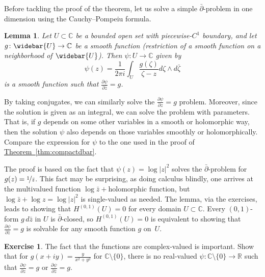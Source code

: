 \documentclass[12pt,openany]{book}
\newcommand{\sabs}[1]{\lvert {#1} \rvert}
\newcommand{\C}{{\mathbb{C}}}
\newcommand{\R}{{\mathbb{R}}}
\theoremstyle{plain}
\newtheorem{lemma}[thm]{Lemma}
\theoremstyle{remark}
\theoremstyle{definition}
\newenvironment{exbox}{%
    \def\FrameCommand{\vrule width 1pt \relax\hspace{10pt}}%
    \MakeFramed{\advance\hsize-\width\FrameRestore}%
}{%
    \endMakeFramed
}
\theoremstyle{exercise}
\newtheorem{exercise}{Exercise}[section]
\theoremstyle{example}
\newcommand{\thmref}[1]{\hyperref[#1]{Theorem~\ref*{#1}}}
\begin{document}
Before tackling the proof of the theorem, let us
solve a simple $\bar{\partial}$-problem in one dimension
using the Cauchy--Pompeiu formula.

\begin{lemma} \label{lemma:dbaronevar}
Let $U \subset \C$ be a bounded open set with piecewise-$C^1$ boundary,
and let $g \colon \widebar{U} \to \C$ be a smooth function (restriction of a
smooth function on a neighborhood of $\widebar{U}$).
Then $\psi \colon U \to \C$ given by
\begin{equation*}
\psi(z) =
\frac{1}{2\pi i} \int_U \frac{g(\zeta)}{\zeta-z} d\zeta \wedge d\bar{\zeta}
\end{equation*}
is a smooth function such that $\frac{\partial \psi}{\partial \bar{z}} = g$.
\end{lemma}

By taking conjugates, we can similarly solve the
$\frac{\partial \psi}{\partial z} = g$ problem.  Moreover, since the
solution is given as an integral, we can solve the problem with
parameters.  That is, if $g$ depends on some other variables in a smooth or
holomorphic way, then the solution $\psi$ also depends on those variables
smoothly or holomorphically.
Compare the expression for $\psi$ to the one used in the proof of
\thmref{thm:compactdbar}.

The proof is based on the fact that $\psi(z) = \log \sabs{z}^2$
solves the $\bar{\partial}$-problem for $g(z) = \nicefrac{1}{\bar{z}}$.
This fact may be surprising, as doing calculus blindly, one arrives
at the multivalued function $\log \bar{z} + \text{holomorphic function}$,
but $\log \bar{z} + \log z = \log \sabs{z}^2$ is single-valued as needed.
The lemma, via the exercises, leads to showing that $H^{(0,1)}(U) = 0$ for
every domain $U \subset \C$.  Every $(0,1)$-form
$g \, d\bar{z}$ in $U$ is $\bar{\partial}$-closed, so $H^{(0,1)}(U) = 0$ is
equivalent to showing that $\frac{\partial \psi}{\partial \bar{z}} = g$
is solvable for any smooth function $g$ on~$U$.

\begin{exbox}
\begin{exercise}
The fact that the functions are complex-valued is important.  Show that
for $g(x+iy) = \frac{y}{x^2+y^2}$ for $\C \setminus \{ 0 \}$,
there is no real-valued $\psi \colon \C \setminus \{ 0 \} \to \R$
such that
$\frac{\partial \psi}{\partial z} = g$ or
$\frac{\partial \psi}{\partial \bar{z}} = g$.
\end{exercise}
\end{exbox}
\end{document}
